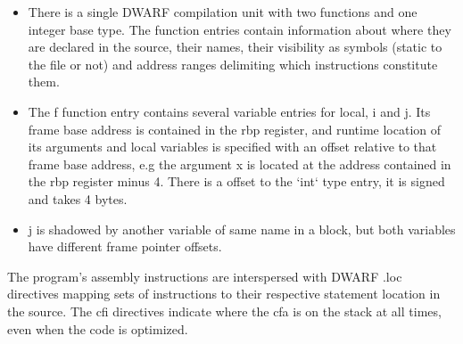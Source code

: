 \begin{itemize}
    \item  There is a single DWARF compilation unit with two functions and one
        integer base type.
        The function entries contain information about where they are declared in the source, their names, their visibility as symbols (static to the file or not) and address ranges delimiting which instructions constitute them.

    \item  The f function entry contains several variable entries for local, i and j.
Its frame base address is contained in the rbp register,
and runtime location of its arguments and local variables is specified with an
offset relative to that frame base address, e.g the argument x is located at the
address contained in the rbp register minus 4.
There is a offset to the `int` type entry, it is signed and takes 4 bytes.

    \item j is shadowed by another variable of same name in a block, but both variables
have different frame pointer offsets.

\end{itemize}

The program's assembly instructions are interspersed with DWARF .loc directives mapping sets of
instructions to their respective statement location in the source.
The \gls{cfi} directives indicate where the \gls{cfa} is on the stack at all times, even when the code is optimized.






\newpage

